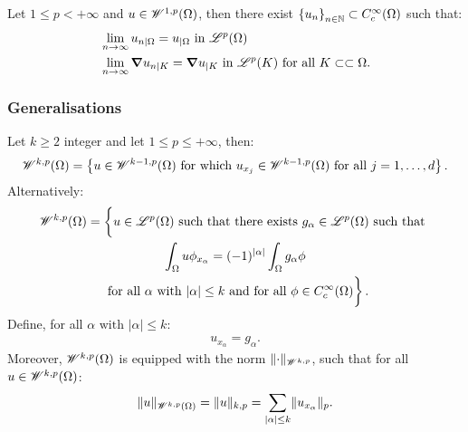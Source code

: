 \begin{theorem}
    Let $1 \leq p < +\infty$ and $u \in \mathscr{W}^{1, p}(\Omega)$, then there exist $\left\{ u_n \right\}_{n \in \mathbb{N}} \subset C_c^{\infty}(\Omega)$ such that:
    \begin{align}
        & \lim_{n \rightarrow \infty} u_{n \mid \Omega} = u_{\mid \Omega} \text { in } \mathscr{L}^{p}(\Omega)\\
        & \lim_{n \rightarrow \infty} \bm{\nabla} u_{n \mid K} = \bm{\nabla} u_{\mid K} \text { in } \mathscr{L}^{p}(K) \text{ for all } K \subset \subset \Omega.
    \end{align}
\end{theorem}

\subsubsection{Generalisations}

\begin{definition}
    Let $k \geq 2$ integer and let $1 \leq p \leq +\infty$, then:
    \begin{gather}
        \mathscr{W}^{k, p}(\Omega) = \left\{ u \in \mathscr{W}^{k - 1, p}(\Omega) \text{ for which } u_{x_j} \in \mathscr{W}^{k - 1, p}(\Omega) \text{ for all } j = 1, \dots, d \right\}.
    \end{gather}
    Alternatively:
    \begin{gather}
        \SpaceWkp{k}{p}(\Omega) = \left\{ \vphantom{\int_{\Omega}} u \in \SpaceLp{p}(\Omega) \text{ such that there exists } g_{\alpha} \in \SpaceLp{p}(\Omega) \text{ such that } \right. \notag \\ 
        \left. \int_{\Omega} u \phi_{x_{\alpha}} = (-1)^{\lvert \alpha \rvert} \int_{\Omega} g_{\alpha} \phi \right. \notag \\
        \left. \text{ for all } \alpha \text{ with } \lvert \alpha \rvert \leq k \text{ and for all }\phi \in C_c^{\infty}(\Omega) \vphantom{\int_{\Omega}} \right\}.
    \end{gather}
    Define, for all $\alpha \text{ with } \lvert \alpha \rvert \leq k$:
    \begin{gather}
        u_{x_{\alpha}} = g_{\alpha}.
    \end{gather}
    Moreover, $\mathscr{W}^{k, p}(\Omega)$ is equipped with the norm $\lVert \cdot \rVert_{\mathscr{W}^{k, p}}$, such that for all $u \in \mathscr{W}^{k, p}(\Omega)$:
    \begin{gather}
        \lVert u \rVert_{\mathscr{W}^{k, p}(\Omega)} = \lVert u \rVert_{k, p} = \sum_{\lvert \alpha \rvert \leq k} \lVert u_{x_{\alpha}} \rVert_p.
    \end{gather}
\end{definition}

